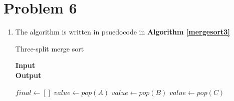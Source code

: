\documentclass{article}
\begin{document}
\section{Problem 6}
\begin{enumerate}[label=\alph*.]
    \item The algorithm is written in psuedocode in \textbf{Algorithm \ref{mergesort3}}
    \begin{algorithm}
        \caption{Three-split merge sort}
        \label{mergesort3}
        \hspace*{\algorithmicindent} \textbf{Input} \\
        \hspace*{\algorithmicindent} \textbf{Output} 
        \begin{algorithmic}[1] %
             
                \State $final \gets []$ 
                        \State $value \gets pop(A)$ 
                        \State $value \gets pop(B)$
                    \Else {}
                        \State $value \gets pop(C)$
                    \EndIf


\end{algorithmic}
\end{algorithm}
\end{enumerate}
\end{document}
